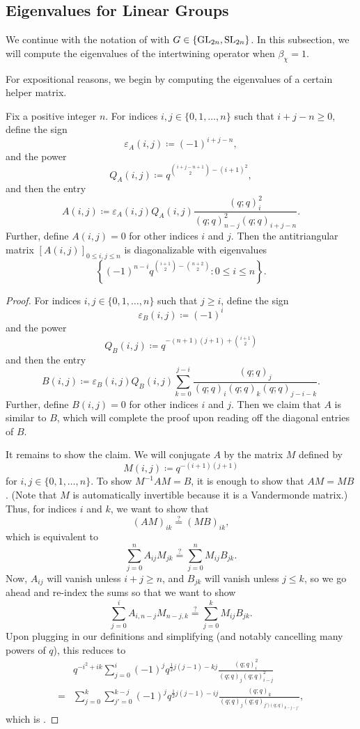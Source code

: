 \subsection{Eigenvalues for Linear Groups}
We continue with the notation of  with $G\in\{\mathrm{GL}_{2n},\mathrm{SL}_{2n}\}$. In this subsection, we will compute the eigenvalues of the intertwining operator when $\beta_\chi=1$.

For expositional reasons, we begin by computing the eigenvalues of a certain helper matrix.
\begin{proposition} \label{prop:gl-helper}
    Fix a positive integer $n$. For indices $i,j\in\{0,1,\ldots,n\}$ such that $i+j-n\ge0$, define the sign
    \[\varepsilon_A(i,j)\coloneqq(-1)^{i+j-n},\]
    and the power
    \[Q_A(i,j)\coloneqq q^{\binom{i+j-n+1}2-\left(i+1\right)^{2}},\]
    and then the entry
    \[A(i,j)\coloneqq\varepsilon_A(i,j)Q_A(i,j)\frac{(q;q)_i^{2}}{(q;q)_{n-j}^{2}(q;q)_{i+j-n}}.\]
    Further, define $A(i,j)=0$ for other indices $i$ and $j$. Then the antitriangular matrix $[A(i,j)]_{0\le i,j\le n}$ is diagonalizable with eigenvalues
    \[\left\{(-1)^{n-i}q^{\binom{i+1}2-\binom{n+2}2}:0\le i\le n\right\}.\]
\end{proposition}
\begin{proof}
    For indices $i,j\in\{0,1,\ldots,n\}$ such that $j\ge i$, define the sign
    \[\varepsilon_B(i,j)\coloneqq(-1)^i\]
    and the power
    \[Q_B(i,j)\coloneqq q^{-(n+1)(j+1)+\binom{i+1}2}\]
    and then the entry
    \[B(i,j)\coloneqq\varepsilon_B(i,j)Q_B(i,j)\sum_{k=0}^{j-i}\frac{(q;q)_j}{(q;q)_i(q;q)_k(q;q)_{j-i-k}}.\]
    Further, define $B(i,j)=0$ for other indices $i$ and $j$. Then we claim that $A$ is similar to $B$, which will complete the proof upon reading off the diagonal entries of $B$.

    It remains to show the claim. We will conjugate $A$ by the matrix $M$ defined by
    \[M(i,j)\coloneqq q^{-(i+1)(j+1)}\]
    for $i,j\in\{0,1,\ldots,n\}$. To show $M^{-1}AM=B$, it is enough to show that $AM=MB$. (Note that $M$ is automatically invertible because it is a Vandermonde matrix.) Thus, for indices $i$ and $k$, we want to show that
    \[(AM)_{ik}\stackrel?=(MB)_{ik},\]
    which is equivalent to
    \[\sum_{j=0}^nA_{ij}M_{jk}\stackrel?=\sum_{j=0}^nM_{ij}B_{jk}.\]
    Now, $A_{ij}$ will vanish unless $i+j\ge n$, and $B_{jk}$ will vanish unless $j\le k$, so we go ahead and re-index the sums so that we want to show
    \[\sum_{j=0}^iA_{i,n-j}M_{n-j,k}\stackrel?=\sum_{j=0}^kM_{ij}B_{jk}.\]
    Upon plugging in our definitions and simplifying (and notably cancelling many powers of $q$), this reduces to
    \begin{align*}
        &q^{-i^{2}+ik}\sum_{j=0}^{i}\left(-1\right)^{j}q^{\frac{1}{2}j\left(j-1\right)-kj}\frac{(q;q)_i^{2}}{(q;q)_j(q;q)_{i-j}^{2}} \\
        ={}&\sum_{j=0}^{k}\sum_{j'=0}^{k-j}\left(-1\right)^{j}q^{\frac{1}{2}j\left(j-1\right)-ij}\frac{(q;q)_k}{(q;q)_j(q;q)_{j')(q;q)_{k-j-j'}}},
    \end{align*}
    which is .
\end{proof}
